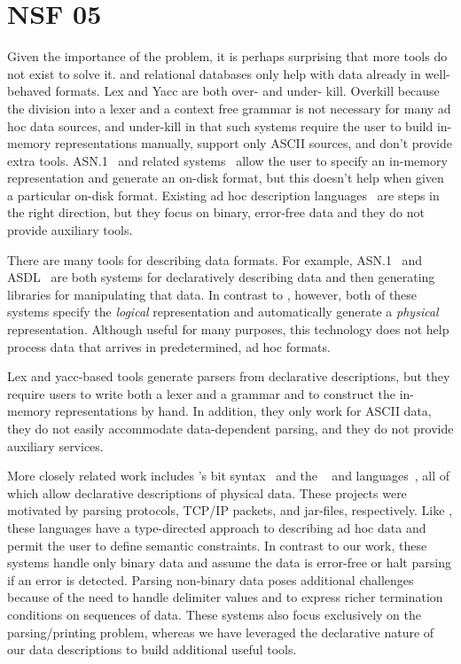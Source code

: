 \documentclass[11pt]{article}
\begin{document}
\section{NSF 05}

Given the importance of the problem, it is perhaps surprising that
more tools do not exist to solve it.  \xml{} and relational databases
only help with data already in well-behaved formats.  Lex and Yacc are
both over- and under- kill.  Overkill because the division into a
lexer and a context free grammar is not necessary for many ad hoc data
sources, and under-kill in that such systems require the user to build
in-memory representations manually, support only ASCII sources, and
don't provide extra tools.  ASN.1~\cite{asn} and related
systems~\cite{asdl} allow the user to specify an in-memory
representation and generate an on-disk format, but this doesn't help
when given a particular on-disk format.  Existing ad hoc description
languages~\cite{gpce02,sigcomm00,erlang} are steps in the right
direction, but they focus on binary, error-free data and they do not
provide auxiliary tools.


There are many tools for describing data formats. For example,
\textsc{ASN.1}~\cite{asn} and \textsc{ASDL}~\cite{asdl} are both
systems for declaratively describing data and then generating
libraries for manipulating that data.  In contrast to \pads{},
however, both of these systems specify the {\em logical\/} representation
and automatically generate a {\em physical\/} representation.
Although useful for many purposes, this technology does not help
process data that arrives in predetermined, ad hoc formats.

Lex and yacc-based tools generate parsers from declarative
descriptions, but they require users to write both a lexer and a
grammar and to construct the in-memory representations by hand.  In
addition, they only work for ASCII data, they do not easily
accommodate data-dependent parsing, and they do not provide auxiliary
services.

More closely related work includes \erlang{}'s bit syntax~\cite{erlang} and
the \packettypes{}~\cite{sigcomm00} and
\datascript{} languages~\cite{gpce02}, 
all of which allow declarative descriptions of physical data.  These projects were motivated by parsing protocols,
\textsc{TCP/IP} packets, and \java{} jar-files, respectively.  Like
\pads{}, these languages have a type-directed approach to
describing ad hoc data and permit the user to define semantic constraints.
In contrast to our
work, these systems handle only binary data and assume the data is
error-free or halt parsing if an error is detected. 
Parsing non-binary data poses additional challenges because of the need
to handle delimiter values and to express richer termination conditions
on sequences of data. These systems also
focus exclusively on the parsing/printing problem, whereas we have 
leveraged the declarative nature of
our data descriptions to build additional useful tools.
\end{document}

